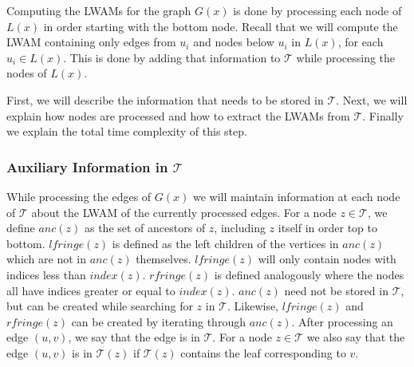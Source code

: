 Computing the LWAMs for the graph $G(x)$ is done by processing each node of $L(x)$ in order starting with the bottom node. Recall that we will compute the LWAM containing only edges from $u_i$ and nodes below $u_i$ in $L(x)$, for each $u_i \in L(x)$. This is done by adding that information to $\mathcal{T}$ while processing the nodes of $L(x)$. 

First, we will describe the information that needs to be stored in $\mathcal{T}$. Next, we will explain how nodes are processed and how to extract the LWAMs from $\mathcal{T}$. Finally we explain the total time complexity of this step.

\subsubsection{Auxiliary Information in $\mathcal{T}$}
While processing the edges of $G(x)$ we will maintain information at each node of $\mathcal{T}$ about the LWAM of the currently processed edges. For a node $z \in \mathcal{T}$, we define $anc(z)$ as the set of ancestors of $z$, including $z$ itself in order top to bottom. $lfringe(z)$ is defined as the left children of the vertices in $anc(z)$ which are not in $anc(z)$ themselves. $lfringe(z)$ will only contain nodes with indices less than $index(z)$. $rfringe(z)$ is defined analogously where the nodes all have indices greater or equal to $index(z)$. $anc(z)$ need not be stored in $\mathcal{T}$, but can be created while searching for $z$ in $\mathcal{T}$. Likewise, $lfringe(z)$ and $rfringe(z)$ can be created by iterating through $anc(z)$. After processing an edge $(u,v)$, we say that the edge is in $\mathcal{T}$. For a node $z \in \mathcal{T}$ we also say that the edge $(u,v)$ is in $\mathcal{T}(z)$ if $\mathcal{T}(z)$ contains the leaf corresponding to $v$.

